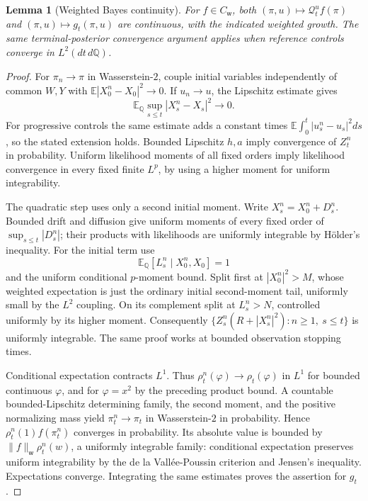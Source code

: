 \documentclass[11pt,a4paper]{article}
\newtheorem{lemma}[theorem]{Lemma}
\theoremstyle{definition}
\theoremstyle{remark}
\newcommand{\E}{\mathbb E}
\newcommand{\Qq}{\mathbb Q}
\newcommand{\CW}{C_{\mathsf w}}
\newcommand{\wt}{\mathsf w}
\newcommand{\cQ}{\mathcal Q}
\begin{document}
\begin{lemma}[Weighted Bayes continuity]\label{lem:Feller}
For \(f\in\CW\), both \((\pi,u)\mapsto\cQ_t^u f(\pi)\) and
\((\pi,u)\mapsto g_t(\pi,u)\) are continuous, with the indicated
weighted growth. The same terminal-posterior convergence argument
applies when reference controls converge in \(L^2(dt\,d\Qq)\).
\end{lemma}
\begin{proof}
For \(\pi_n\to\pi\) in Wasserstein-\(2\), couple initial variables
independently of common \(W,Y\) with
\(\E|X_0^n-X_0|^2\to0\). If \(u_n\to u\), the Lipschitz estimate gives
\[
 \E_\Qq\sup_{s\leq t}|X_s^n-X_s|^2\longrightarrow0.
\]
For progressive controls the same estimate adds a constant times
\(\E\int_0^t|u_s^n-u_s|^2ds\), so the stated extension holds.
Bounded Lipschitz \(h,a\) imply convergence of \(Z_t^n\) in probability.
Uniform likelihood moments of all fixed orders imply likelihood
convergence in every fixed finite \(L^p\), by using a higher moment
for uniform integrability.

The quadratic step uses only a second initial moment. Write
\(X_s^n=X_0^n+D_s^n\). Bounded drift and diffusion give uniform
moments of every fixed order of
\(\sup_{s\leq t}|D_s^n|\); their products with likelihoods are uniformly
integrable by Hölder's inequality. For the initial term use
\[
 \E_\Qq[L_s^n\mid X_0^n,X_0]=1
\]
and the uniform conditional \(p\)-moment bound. Split first at
\(|X_0^n|^2>M\), whose weighted expectation is just the ordinary initial
second-moment tail, uniformly small by the \(L^2\) coupling.
On its complement split at \(L_s^n>N\), controlled uniformly by its
higher moment. Consequently
\(\{Z_s^n(R+|X_s^n|^2):n\geq1,\ s\leq t\}\) is uniformly integrable.
The same proof works at bounded observation stopping times.

Conditional expectation contracts \(L^1\). Thus
\(\rho_t^n(\varphi)\to\rho_t(\varphi)\) in \(L^1\) for bounded continuous
\(\varphi\), and for \(\varphi=x^2\) by the preceding product bound.
A countable bounded-Lipschitz determining family, the second moment,
and the positive normalizing mass yield
\(\pi_t^n\to\pi_t\) in Wasserstein-\(2\) in probability.
Hence \(\rho_t^n(1)f(\pi_t^n)\) converges in probability.
Its absolute value is bounded by
\(\|f\|_{\wt}\rho_t^n(w)\), a uniformly integrable family:
conditional expectation preserves uniform integrability by the
de la Vallée-Poussin criterion and Jensen's inequality.
Expectations converge. Integrating the same estimates proves the
assertion for \(g_t\).
\end{proof}
\end{document}
